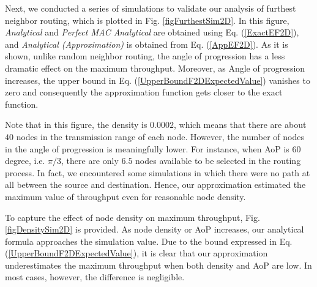 \documentclass[12pt, draftclsnofoot, onecolumn]{IEEEtran}
\begin{document}
Next, we conducted a series of simulations to validate our analysis of 
furthest neighbor routing, which is plotted in Fig. \ref{figFurthestSim2D}. 
In this figure, \textit{Analytical} and \textit{Perfect MAC Analytical} 
are obtained using Eq. (\ref{ExactEF2D}), and \textit{Analytical (Approximation)} 
is obtained from Eq. (\ref{AppEF2D}). As it is shown, unlike random 
neighbor routing, the angle of progression has a less dramatic effect 
on the maximum throughput. Moreover, as Angle of progression increases, 
the upper bound in Eq. (\ref{UpperBoundF2DExpectedValue}) vanishes to 
zero and consequently the approximation function gets closer to the exact 
function. 

Note that in this figure, the density is $0.0002$, which means that there 
are about $40$ nodes in the transmission range of each node. However, 
the number of nodes in the angle of progression is meaningfully lower. For 
instance, when AoP is $60$ degree, i.e. $\pi /3$, there are only $6.5$ nodes 
available to be selected in the routing process. In fact, we encountered some 
simulations in which there were no path at all between the source and destination. 
Hence, our approximation estimated the maximum value of throughput even for 
reasonable node density.

\begin{figure*}[t!]
\begin{center}
\caption{Effect of node density on the maximum end-to-end throughput in $2$-D networks.}
\label{figDensitySim2D}
\end{center}
\end{figure*}

To capture the effect of node density on maximum throughput, 
Fig. \ref{figDensitySim2D} is provided. As node density or AoP 
increases, our analytical formula approaches the simulation 
value. Due to the bound expressed in Eq. (\ref{UpperBoundF2DExpectedValue}), 
it is clear that our approximation underestimates the maximum 
throughput when both density and AoP are low. In most cases, 
however, the difference is negligible.





\end{document}
